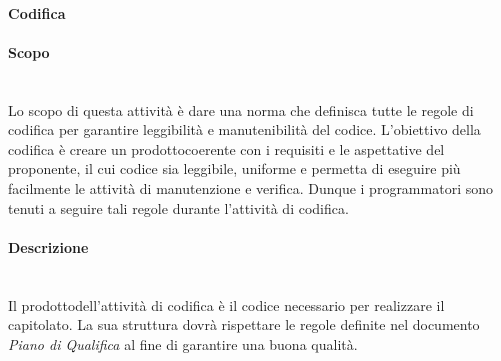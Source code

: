 			\paragraph{Codifica}
			\paragraph*{Scopo}\mbox{}\\ [1mm]
			Lo scopo di questa attività è dare una norma che definisca tutte le regole di codifica per garantire leggibilità e manutenibilità del codice.
			L'obiettivo della codifica è creare un prodotto\glosp coerente con i requisiti e le aspettative del proponente, il cui codice sia leggibile, uniforme e permetta di eseguire più facilmente le attività di manutenzione e verifica. Dunque i programmatori sono tenuti a seguire tali regole durante l'attività di codifica.
			\paragraph*{Descrizione}\mbox{}\\ [1mm]
			Il prodotto\glosp dell'attività di codifica è il codice necessario per realizzare il capitolato\glo. La sua struttura dovrà rispettare le regole definite nel documento \textit{Piano di Qualifica} al fine di garantire una buona qualità.
